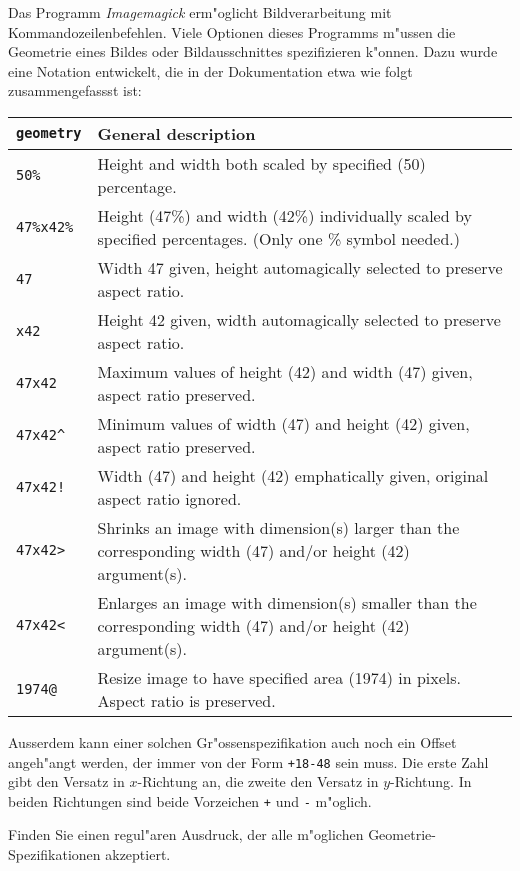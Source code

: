 Das Programm {\em Imagemagick} erm"oglicht Bildverarbeitung mit
Kommandozeilenbefehlen. Viele Optionen dieses Programms m"ussen die
Geometrie eines Bildes oder Bildausschnittes spezifizieren k"onnen.
Dazu wurde eine Notation entwickelt, die in der Dokumentation etwa
wie folgt zusammengefassst ist:
\begin{center}
\begin{tabular}{>{\tt}lp{5.75in}}
\rm geometry&General description\\
\hline
50\%&Height and width both scaled by specified (50) percentage.\\
47\%x42\%&Height (47\%) and width (42\%) individually scaled by specified
percentages. (Only one \% symbol needed.)\\
47&Width 47 given, height automagically selected to preserve aspect ratio.\\
x42&Height 42 given, width automagically selected to preserve aspect ratio.\\
47x42&Maximum values of height (42) and width (47) given, aspect ratio
preserved.\\
47x42\^&Minimum values of width (47) and height (42) given, aspect ratio
preserved.\\
47x42!&Width (47) and height (42) emphatically given, original
aspect ratio ignored.\\
47x42>&Shrinks an image with dimension(s) larger than the
corresponding width (47) and/or height (42) argument(s).\\
47x42<&Enlarges an image with dimension(s) smaller than the
corresponding width (47) and/or height (42) argument(s).\\
1974@&Resize image to have specified area (1974) in pixels. Aspect ratio is
preserved.\\
\hline
\end{tabular}
\end{center}
Ausserdem kann einer solchen Gr"ossenspezifikation auch noch ein Offset
angeh"angt werden, der immer von der Form
\texttt{+18-48}
sein muss. Die erste Zahl gibt den Versatz in $x$-Richtung an, die zweite
den Versatz in $y$-Richtung. In beiden Richtungen sind beide Vorzeichen 
\texttt{+} und \texttt{-} m"oglich.

Finden Sie einen regul"aren Ausdruck, der alle m"oglichen
Geometrie-Spezifikationen akzeptiert.


